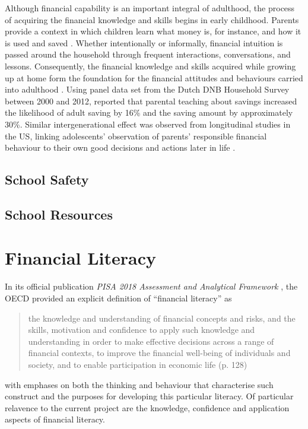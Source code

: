 \documentclass[a4paper,11pt,UKenglish,twoside,openright]{report}\usepackage[]{graphicx}\usepackage[]{color}
\begin{document}
Although financial capability is an important integral of adulthood, the process of acquiring the financial knowledge and skills begins in early childhood. Parents provide a context in which children learn what money is, for instance, and how it is used and saved \parencite{birbili:2015}. Whether intentionally or informally, financial intuition is passed around the household through frequent interactions, conversations, and lessons. Consequently, the financial knowledge and skills acquired while growing up at home form the foundation for the financial attitudes and behaviours carried into adulthood \parencite{serido:2016}. Using panel data set from the Dutch DNB Household Survey between 2000 and 2012, \textcite{bucciol:2014} reported that parental teaching about savings increased the likelihood of adult saving by 16\% and the saving amount by approximately 30\%. Similar intergenerational effect was observed from longitudinal studies in the US, linking adolescents' observation of parents' responsible financial behaviour to their own good decisions and actions later in life \parencite{tang:2017}.

\subsection{School Safety}

\parencite{kutsyuruba:2015}

\subsection{School Resources}

\section{Financial Literacy}\label{sec:flit}

In its official publication \textit{PISA 2018 Assessment and Analytical Framework} \parencite{PISAframework}, the OECD provided an explicit definition of ``financial literacy'' as
\vspace{-1em} %
    \blockquote{the knowledge and understanding of financial concepts and risks, and the skills, motivation and confidence to apply such knowledge and understanding in order to make effective decisions across a range of financial contexts, to improve the financial well-being of individuals and society, and to enable participation in economic life (p. 128)}
\vspace{-1em} %
with emphases on both the thinking and behaviour that characterise such construct and the purposes for developing this particular literacy. Of particular relavence to the current project are the knowledge, confidence and application aspects of financial literacy.
\end{document}
